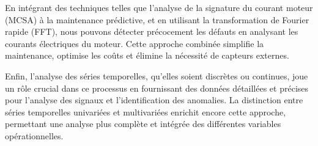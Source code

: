 En intégrant des techniques telles que l'analyse de la signature du courant
moteur (MCSA) à la maintenance prédictive, et en utilisant la transformation de
Fourier rapide (FFT), nous pouvons détecter précocement les défauts en analysant les
courants électriques du moteur. Cette approche combinée simplifie la
maintenance, optimise les coûts et élimine la nécessité de capteurs externes.

Enfin, l'analyse des séries temporelles, qu'elles soient discrètes ou
continues, joue un rôle crucial dans ce processus en fournissant des données
détaillées et précises pour l'analyse des signaux et l'identification des
anomalies. La distinction entre séries temporelles univariées et multivariées
enrichit encore cette approche, permettant une analyse plus complète et
intégrée des différentes variables opérationnelles.

